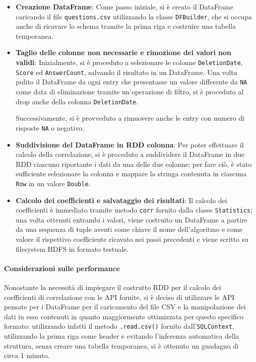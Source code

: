   \begin{itemize}
    \item
      \textbf{Creazione DataFrame}:
      Come passo iniziale, si è creato il DataFrame caricando il file \texttt{questions.csv} utilizzando la
      classe \texttt{DFBuilder}, che si occupa anche di ricavare lo schema tramite la prima riga e costruire una tabella temporanea.

    \item
      \textbf{Taglio delle colonne non necessarie e rimozione dei valori non validi}:
      Inizialmente, si è proceduto a selezionare le colonne \texttt{DeletionDate}, \texttt{Score} ed \texttt{AnswerCount}, salvando il risultato in un DataFrame.
      Una volta pulito il DataFrame da ogni entry che presentasse un valore differente da \texttt{NA} come data di eliminazione tramite un'operazione di filtro,
      si è proceduto al drop anche della colonna \texttt{DeletionDate}.

      Successivamente, si è provveduto a rimuovere anche le entry con numero di risposte \texttt{NA} o negativo.

    \item
      \textbf{Suddivisione del DataFrame in RDD colonna}:
      Per poter effettuare il calcolo della correlazione, si è proceduto a suddividere il DataFrame in due RDD ciascuno riportante i dati da una delle due colonne;
      per fare ciò, è stato sufficiente selezionare la colonna e mappare la stringa contenuta in ciascuna \texttt{Row} in un valore \texttt{Double}.

    \item
      \textbf{Calcolo dei coefficienti e salvataggio dei risultati}:
      Il calcolo dei coefficienti è immediato tramite metodo \texttt{corr} fornito dalla classe \texttt{Statistics};
      una volta ottenuti entrambi i valori, viene costruito un DataFrame a partire da una sequenza di tuple
      aventi come chiave il nome dell'algoritmo e come valore il rispettivo coefficiente ricavato nei passi precedenti
      e viene scritto su filesystem HDFS in formato testuale.
  \end{itemize}

  \paragraph{Considerazioni sulle performance}\label{par:job3:performance}

  Nonostante la necessità di impiegare il costrutto RDD per il calcolo dei coefficienti di correlazione con le API fornite,
  si è deciso di utilizzare le API pensate per i DataFrame per il caricamento del file CSV e la manipolazione dei dati in esso contenuti
  in quanto maggiormente ottimizzata per questo specifico formato:
  utilizzando infatti il metodo \texttt{.read.csv()} fornito dall'\texttt{SQLContext}, utilizzando la prima riga come header e evitando l'inferenza automatica della struttura, senza creare una tabella temporanea,
  si è ottenuto un guadagno di circa 1 minuto.

